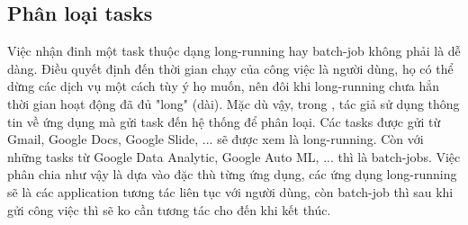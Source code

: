 \documentclass{my_style}
\begin{document}
\subsection*{Phân loại tasks}
Việc nhận đinh một task thuộc dạng long-running hay batch-job không phải là dễ dàng. Điều quyết định đến thời gian chạy của công việc là người dùng, họ có thể dừng các dịch vụ một cách tùy ý họ muốn, nên đôi khi long-running chưa hẳn thời gian hoạt động đã đủ "long" (dài). Mặc dù vậy, trong \cite{17}, tác giả sử dụng thông tin về ứng dụng mà gửi task đến hệ thống để phân loại. Các tasks được gửi từ Gmail, Google Docs, Google Slide, ... sẽ được xem là long-running. Còn với những tasks từ Google Data Analytic, Google Auto ML, ... thì là batch-jobs.  Việc phân chia như vậy là dựa vào đặc thù từng ứng dụng, các ứng dụng long-running sẽ là các application tương tác liên tục với người dùng, còn batch-job thì sau khi gửi công việc thì sẽ ko cần tương tác cho đến khi kết thúc.
\end{document}
